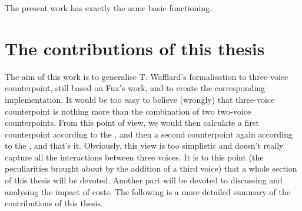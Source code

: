 The present work has exactly the same basic functioning. 


\section{The contributions of this thesis}
The aim of this work is to generalise T. Wafflard's formalisation to three-voice counterpoint, still based on Fux's work, and to create the corresponding implementation. It would be too easy to believe (wrongly) that three-voice counterpoint is nothing more than the combination of two two-voice counterpoints. From this point of view, we would then calculate a first counterpoint according to the \cf, and then a second counterpoint again according to the \cf, and that's it. Obviously, this view is too simplistic and doesn't really capture all the interactions between three voices. It is to this point (the peculiarities brought about by the addition of a third voice) that a whole section of this thesis will be devoted. Another part will be devoted to discussing and analysing the impact of costs. The following is a more detailed summary of the contributions of this thesis. 
